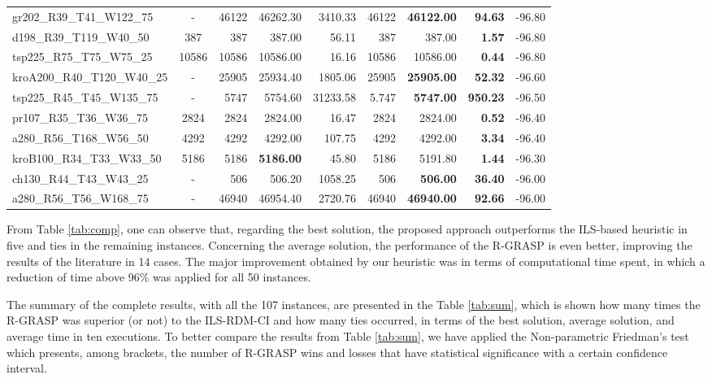 \documentclass{ro}
\begin{document}
\begin{table}[!ht]
{\begin{tabular}{lcrrrrrrr}
gr202\_R39\_T41\_W122\_75 & - & 46122 & 46262.30 & 3410.33 & 46122 & \textbf{46122.00} & \textbf{94.63} & -96.80 \\
d198\_R39\_T119\_W40\_50 & 387 & 387 & 387.00 & 56.11 & 387 & 387.00 & \textbf{1.57} & -96.80 \\
tsp225\_R75\_T75\_W75\_25 & 10586 & 10586 & 10586.00 & 16.16 & 10586 & 10586.00 & \textbf{0.44} & -96.80 \\
kroA200\_R40\_T120\_W40\_25 & - & 25905 & 25934.40 & 1805.06 & 25905 & \textbf{25905.00} & \textbf{52.32} & -96.60 \\
tsp225\_R45\_T45\_W135\_75 & - & 5747 & 5754.60 & 31233.58 & 5.747 & \textbf{5747.00} & \textbf{950.23} & -96.50 \\
pr107\_R35\_T36\_W36\_75 & 2824 & 2824 & 2824.00 & 16.47 & 2824 & 2824.00 & \textbf{0.52} & -96.40 \\
a280\_R56\_T168\_W56\_50 & 4292 & 4292 & 4292.00 & 107.75 & 4292 & 4292.00 & \textbf{3.34} & -96.40 \\
kroB100\_R34\_T33\_W33\_50 & 5186 & 5186 & \textbf{5186.00} & 45.80 & 5186 & 5191.80 & \textbf{1.44} & -96.30 \\
ch130\_R44\_T43\_W43\_25 & - & 506 & 506.20 & 1058.25 & 506 & \textbf{506.00} & \textbf{36.40} & -96.00 \\
a280\_R56\_T56\_W168\_75 & - & 46940 & 46954.40 & 2720.76 & 46940 & \textbf{46940.00} & \textbf{92.66} & -96.00\\
\hline
\end{tabular}}
\end{table}


From Table \ref{tab:comp}, one can observe that, regarding the best solution, the proposed approach
outperforms the ILS-based heuristic in five and ties in the remaining instances. Concerning the average solution, the performance of the R-GRASP is even better, improving the results of the literature in 14 cases. The major improvement obtained by our heuristic was in terms of computational time spent, in which a reduction of time above 96\% was applied for all 50 instances.


The summary of the complete results, with all the 107 instances,  are presented in
the Table \ref{tab:sum},  which is shown how many times the R-GRASP was superior (or
not) to the ILS-RDM-CI and how many ties occurred, in terms of the best solution, average solution, and average time in ten executions. To better compare the results from Table \ref{tab:sum}, we have applied the Non-parametric
Friedman's test \cite{siegal1956nonparametric}  which presents, among brackets, the number of R-GRASP
wins and losses that have statistical significance with a certain confidence interval.
\end{document}
